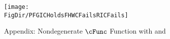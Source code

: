 \hypertarget{PFGICHoldsFHWCFailsRICFails}{}
\begin{figure}
\centerline{\texttt{[image: \\FigDir/PFGICHoldsFHWCFailsRICFails]}}
\caption{Appendix: Nondegenerate $\cFunc$ Function with  and }
\label{fig:PFGICHoldsFHWCFailsRICFails}
\end{figure}
